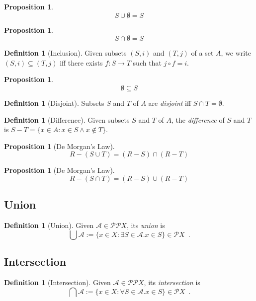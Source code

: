 \documentclass{book}
\newtheorem{prop}[ax]{Proposition}
\theoremstyle{definition}
\newtheorem{df}[ax]{Definition}
\begin{document}
\begin{prop}
\[ S \cup \emptyset = S \]
\end{prop}

\begin{prop}
\[ S \cap \emptyset = S \]
\end{prop}

\begin{df}[Inclusion]
Given subsets $(S,i)$ and $(T,j)$ of a set $A$, we write $(S,i) \subseteq (T,j)$ iff there exists $f : S \rightarrow T$ such that $j \circ f = i$.
\end{df}

\begin{prop}
\[ \emptyset \subseteq S \]
\end{prop}

\begin{df}[Disjoint]
Subsets $S$ and $T$ of $A$ are \emph{disjoint} iff $S \cap T = \emptyset$.
\end{df}

\begin{df}[Difference]
Given subsets $S$ and $T$ of $A$, the \emph{difference} of $S$ and $T$ is $S - T = \{ x \in A : x \in S \wedge x \notin T \}$.
\end{df}

\begin{prop}[De Morgan's Law]
\[ R - (S \cup T) = (R - S) \cap (R - T) \]
\end{prop}

\begin{prop}[De Morgan's Law]
\[ R - (S \cap T) = (R - S) \cup (R - T) \]
\end{prop}

\subsection{Union} %

\begin{df}[Union]
Given $\mathcal{A} \in \mathcal{P} \mathcal{P} X$, its \emph{union} is
\[ \bigcup \mathcal{A} := \{ x \in X : \exists S \in \mathcal{A}. x \in S \} \in \mathcal{P} X \enspace . \]
\end{df}

\subsection{Intersection} %

\begin{df}[Intersection]
Given $\mathcal{A} \in \mathcal{P} \mathcal{P} X$, its \emph{intersection} is
\[ \bigcap \mathcal{A} := \{ x \in X : \forall S \in \mathcal{A}. x \in S \} \in \mathcal{P} X \enspace . \]
\end{df}
\end{document}
